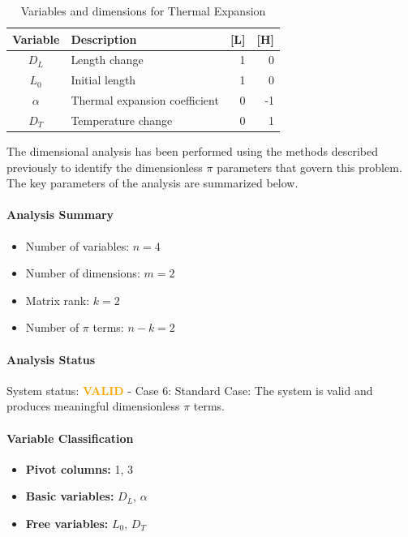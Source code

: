 \begin{table}[H]
\centering
\begin{tabular}{|c|l|r|r|}
\hline
\textbf{Variable} & \textbf{Description} & \textbf{[L]} & \textbf{[H]} \\
\hline
$D_L$ & Length change & 1 & 0 \\
$L_0$ & Initial length & 1 & 0 \\
$\alpha$ & Thermal expansion coefficient & 0 & -1 \\
$D_T$ & Temperature change & 0 & 1 \\

\hline
\end{tabular}
\caption{Variables and dimensions for Thermal Expansion}
\end{table}

The dimensional analysis has been performed using the methods described previously to identify the dimensionless $\pi$ parameters that govern this problem. The key parameters of the analysis are summarized below.

\paragraph{Analysis Summary}
\begin{itemize}
\item Number of variables: $n = 4$
\item Number of dimensions: $m = 2$
\item Matrix rank: $k = 2$
\item Number of $\pi$ terms: $n - k = 2$
\end{itemize}

\paragraph{Analysis Status}
System status: \textcolor{orange}{\textbf{VALID}} - Case 6: Standard Case: The system is valid and produces meaningful dimensionless $\pi$ terms.


\paragraph{Variable Classification}
\begin{itemize}
\item \textbf{Pivot columns:} 1, 3
\item \textbf{Basic variables:} $D_L$, $\alpha$
\item \textbf{Free variables:} $L_0$, $D_T$
\end{itemize}


